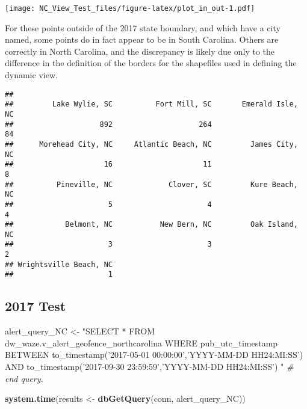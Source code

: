 \documentclass[]{article}
\newenvironment{Shaded}{\begin{snugshade}}{\end{snugshade}}
\newcommand{\CommentTok}[1]{\textcolor[rgb]{0.56,0.35,0.01}{\textit{#1}}}
\newcommand{\DataTypeTok}[1]{\textcolor[rgb]{0.13,0.29,0.53}{#1}}
\newcommand{\KeywordTok}[1]{\textcolor[rgb]{0.13,0.29,0.53}{\textbf{#1}}}
\newcommand{\NormalTok}[1]{#1}
\newcommand{\OperatorTok}[1]{\textcolor[rgb]{0.81,0.36,0.00}{\textbf{#1}}}
\newcommand{\StringTok}[1]{\textcolor[rgb]{0.31,0.60,0.02}{#1}}
\begin{document}
\texttt{[image: NC\_View\_Test\_files/figure-latex/plot\_in\_out-1.pdf]}

For these points outside of the 2017 state boundary, and which have a
city named, some points do in fact appear to be in South Carolina.
Others are correctly in North Carolina, and the discrepancy is likely
due only to the difference in the definition of the borders for the
shapefiles used in defining the dynamic view.

\begin{Shaded}
\end{Shaded}

\begin{verbatim}
## 
##         Lake Wylie, SC          Fort Mill, SC       Emerald Isle, NC 
##                    892                    264                     84 
##      Morehead City, NC     Atlantic Beach, NC         James City, NC 
##                     16                     11                      8 
##          Pineville, NC             Clover, SC         Kure Beach, NC 
##                      5                      4                      4 
##            Belmont, NC           New Bern, NC         Oak Island, NC 
##                      3                      3                      2 
## Wrightsville Beach, NC 
##                      1
\end{verbatim}

\hypertarget{test-1}{%
\subsection{2017 Test}\label{test-1}}

\begin{Shaded}
\begin{Highlighting}[]
\NormalTok{alert_query_NC <-}\StringTok{ "SELECT * FROM dw_waze.v_alert_geofence_northcarolina }
\StringTok{                    WHERE pub_utc_timestamp BETWEEN to_timestamp('2017-05-01 00:00:00','YYYY-MM-DD HH24:MI:SS') }
\StringTok{                                          AND     to_timestamp('2017-09-30 23:59:59','YYYY-MM-DD HH24:MI:SS')}
\StringTok{                      "} \CommentTok{# end query. }

\KeywordTok{system.time}\NormalTok{(results <-}\StringTok{ }\KeywordTok{dbGetQuery}\NormalTok{(conn, alert_query_NC))}
\end{Highlighting}
\end{Shaded}
\end{document}
